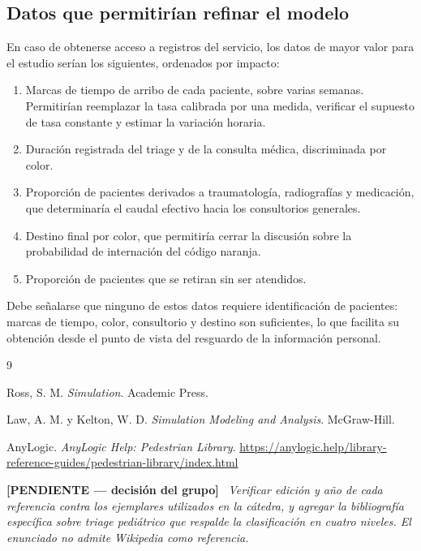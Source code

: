 \documentclass{article}
\newenvironment{pendiente}
  {\par\medskip\noindent\begingroup\color{red!65!black}%
   \textbf{[PENDIENTE — decisión del grupo]}\ \itshape}
  {\endgroup\par\medskip}
\begin{document}
\subsection{Datos que permitirían refinar el modelo}

En caso de obtenerse acceso a registros del servicio, los datos de mayor
valor para el estudio serían los siguientes, ordenados por impacto:

\begin{enumerate}
  \item Marcas de tiempo de arribo de cada paciente, sobre varias semanas.
  Permitirían reemplazar la tasa calibrada por una medida, verificar el
  supuesto de tasa constante y estimar la variación horaria.
  \item Duración registrada del triage y de la consulta médica, discriminada
  por color.
  \item Proporción de pacientes derivados a traumatología, radiografías y
  medicación, que determinaría el caudal efectivo hacia los consultorios
  generales.
  \item Destino final por color, que permitiría cerrar la discusión sobre la
  probabilidad de internación del código naranja.
  \item Proporción de pacientes que se retiran sin ser atendidos.
\end{enumerate}

Debe señalarse que ninguno de estos datos requiere identificación de
pacientes: marcas de tiempo, color, consultorio y destino son suficientes, lo
que facilita su obtención desde el punto de vista del resguardo de la
información personal.


\begin{thebibliography}{9}

Ross, S. M.
\textit{Simulation}.
Academic Press.

Law, A. M. y Kelton, W. D.
\textit{Simulation Modeling and Analysis}.
McGraw-Hill.

AnyLogic.
\textit{AnyLogic Help: Pedestrian Library}.
\url{https://anylogic.help/library-reference-guides/pedestrian-library/index.html}

\end{thebibliography}

\begin{pendiente}
Verificar edición y año de cada referencia contra los ejemplares utilizados
en la cátedra, y agregar la bibliografía específica sobre triage pediátrico
que respalde la clasificación en cuatro niveles. El enunciado no admite
Wikipedia como referencia.
\end{pendiente}
\end{document}
